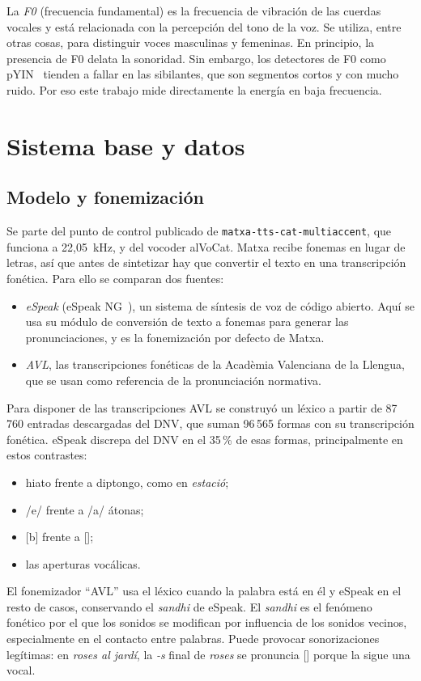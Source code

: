 \documentclass[conference]{IEEEtran}
\newcommand{\fz}{\textipa{z}}
\begin{document}
La \emph{F0} (frecuencia fundamental) es la frecuencia de vibración de las cuerdas vocales y está relacionada con la percepción del tono de la voz. Se utiliza, entre otras cosas, para distinguir voces masculinas y femeninas. En principio, la presencia de F0 delata la sonoridad. Sin embargo, los detectores de F0 como pYIN~\cite{mauch2014pyin} tienden a fallar en las sibilantes, que son segmentos cortos y con mucho ruido. Por eso este trabajo mide directamente la energía en baja frecuencia.

\section{Sistema base y datos}

\subsection{Modelo y fonemización}
Se parte del punto de control publicado de \texttt{matxa-tts-cat-multiaccent}, que funciona a 22,05~kHz, y del vocoder alVoCat. Matxa recibe fonemas en lugar de letras, así que antes de sintetizar hay que convertir el texto en una transcripción fonética. Para ello se comparan dos fuentes:
\begin{itemize}
\item \emph{eSpeak} (eSpeak NG~\cite{espeakng}), un sistema de síntesis de voz de código abierto. Aquí se usa su módulo de conversión de texto a fonemas para generar las pronunciaciones, y es la fonemización por defecto de Matxa.
\item \emph{AVL}, las transcripciones fonéticas de la Acadèmia Valenciana de la Llengua, que se usan como referencia de la pronunciación normativa.
\end{itemize}
Para disponer de las transcripciones AVL se construyó un léxico a partir de 87\,760 entradas descargadas del DNV, que suman 96\,565 formas con su transcripción fonética. eSpeak discrepa del DNV en el 35\,\% de esas formas, principalmente en estos contrastes:
\begin{itemize}
\item hiato frente a diptongo, como en \textit{estació};
\item /e/ frente a /a/ átonas;
\item {[b]} frente a [];
\item las aperturas vocálicas.
\end{itemize}
El fonemizador ``AVL'' usa el léxico cuando la palabra está en él y eSpeak en el resto de casos, conservando el \textit{sandhi} de eSpeak. El \emph{sandhi} es el fenómeno fonético por el que los sonidos se modifican por influencia de los sonidos vecinos, especialmente en el contacto entre palabras. Puede provocar sonorizaciones legítimas: en \textit{roses al jardí}, la \textit{-s} final de \textit{roses} se pronuncia [\fz] porque la sigue una vocal.
\end{document}
